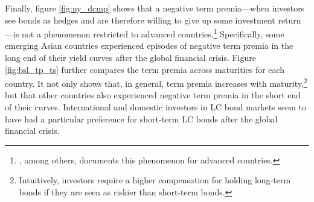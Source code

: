 {Finally, figure \ref{fig:ny_dcmp} shows that a negative term premia---when investors see bonds as hedges and are therefore willing to give up some investment return---is not a phenomenon restricted to advanced countries.\footnote{ \cite{Wright:2011}, among others, documents this phenomenon for advanced countries.}
Specifically, some emerging Asian countries experienced episodes of negative term premia in the long end of their yield curves after the global financial crisis.
Figure \ref{fig:bsl_tp_ts} further compares the term premia across maturities for each country.
It not only shows that, in general, term premia increases with maturity,\footnote{ Intuitively, investors require a higher compensation for holding long-term bonds if they are seen as riskier than short-term bonds.} but that other countries also experienced negative term premia in the short end of their curves. %
International and domestic investors in LC bond markets seem to have had a particular preference for short-term LC bonds after the global financial crisis.

}
